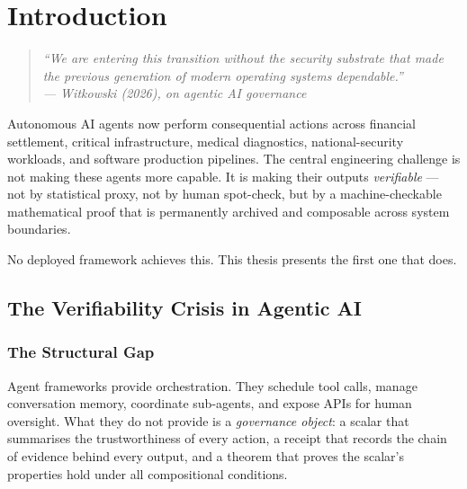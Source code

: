 

\chapter{Introduction}
\label{chap:intro}

\begin{quote}
\itshape
``We are entering this transition without the security substrate that made
the previous generation of modern operating systems dependable.''\\
\upshape\normalsize\hfill --- Witkowski (2026), on agentic AI governance
\end{quote}

\bigskip

Autonomous AI agents now perform consequential actions across financial
settlement, critical infrastructure, medical diagnostics, national-security
workloads, and software production pipelines.
The central engineering challenge is not making these agents more capable.
It is making their outputs \emph{verifiable} --- not by statistical proxy,
not by human spot-check, but by a machine-checkable mathematical proof that
is permanently archived and composable across system boundaries.

\medskip

No deployed framework achieves this.
This thesis presents the first one that does.


\section{The Verifiability Crisis in Agentic AI}
\label{sec:crisis}

\subsection{The Structural Gap}

Agent frameworks provide orchestration.
They schedule tool calls, manage conversation memory, coordinate
sub-agents, and expose APIs for human oversight.
What they do not provide is a \emph{governance object}: a scalar that
summarises the trustworthiness of every action, a receipt that records the
chain of evidence behind every output, and a theorem that proves the
scalar's properties hold under all compositional conditions.

